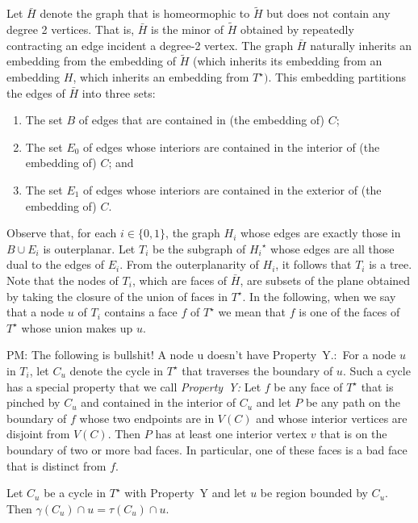 \documentclass{patmorin}
\newcommand{\dual}[1]{{#1}^\star}
\newcommand{\note}[2]{{\color{red}#1:~#2}}
\begin{document}
Let $\bar{H}$ denote the graph that is homeormophic to $\tilde{H}$ but does not
contain any degree 2 vertices.  That is, $\bar{H}$ is the minor of $\tilde{H}$
obtained by repeatedly contracting an edge incident a degree-2 vertex.
The graph $\bar{H}$ naturally inherits an embedding from the embedding of $\tilde{H}$ (which inherits its embedding from an embedding $H$, which inherits an embedding from $\dual{T})$.  This embedding partitions the edges of $\bar{H}$ into three sets:
\begin{enumerate}
  \item The set $B$ of edges that are contained in (the embedding of) $C$;
  \item The set $E_0$ of edges whose interiors are contained in the interior of (the embedding of) $C$; and
  \item The set $E_1$ of edges whose interiors are contained in the exterior of (the embedding of) $C$.
\end{enumerate}

Observe that, for each $i\in\{0,1\}$, the graph $H_i$ whose edges are
exactly those in $B\cup E_i$ is outerplanar.  Let $T_i$ be the subgraph of
$\dual{H_i}$ whose edges are all those dual to the edges of $E_i$. From
the outerplanarity of $H_i$, it follows that $T_i$ is a tree. Note that
the nodes of $T_i$, which are faces of $\bar{H}$, are subsets of the
plane obtained by taking the closure of the union of faces in $\dual{T}$.
In the following, when we say that a node $u$ of $T_i$ contains a face
$f$ of $\dual{T}$ we mean that $f$ is one of the faces of $\dual{T}$
whose union makes up $u$.

\note{PM: The following is bullshit! A node u doesn't have Property~Y.}
For a node $u$ in $T_i$, let $C_u$ denote the cycle in $\dual{T}$ that
traverses the boundary of $u$.  Such a cycle has a special property that
we call \emph{Property~Y:} Let $f$ be any face of $\dual{T}$ that is
pinched by $C_u$ and contained in the interior of $C_u$ and let $P$ be any
path on the boundary of $f$ whose two endpoints are in $V(C)$ and whose
interior vertices are disjoint from $V(C)$.  Then $P$ has at least one
interior vertex $v$ that is on the boundary of two or more bad faces. In
particular, one of these faces is a bad face that is distinct from $f$.

\begin{lem}
   Let $C_u$ be a cycle in $\dual{T}$ with Property~Y and let $u$ be
   region bounded by $C_u$.  Then $\gamma(C_u)\cap u= \tau(C_u)\cap u$.
\end{lem}
\end{document}
